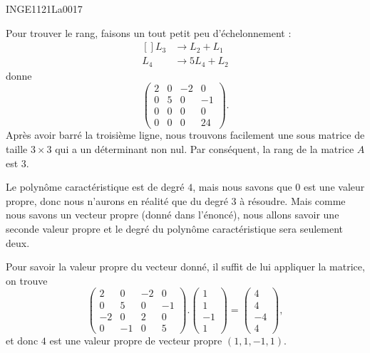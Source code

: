 

\begin{corrige}{INGE1121La0017}

	Pour trouver le rang, faisons un tout petit peu d'échelonnement :
	\begin{equation}
		\begin{aligned}[]
			L_3&\to L_2+L_1\\
			L_4&\to 5L_4+L_2
		\end{aligned}
	\end{equation}
	donne
	\begin{equation}
		\begin{pmatrix}
			 2	&	0	&	-2	&	0	\\
			 0	&	5	&	0	&	-1	\\
			 0	&	0	&	0	&	0	\\ 
			 0	&	0	&	0	&	24	 
		 \end{pmatrix}.
	\end{equation}
	Après avoir barré la troisième ligne, nous trouvons facilement une sous matrice de taille $3\times 3$ qui a un déterminant non nul. Par conséquent, la rang de la matrice $A$ est $3$.
	
	Le polynôme caractéristique est de degré $4$, mais nous savons que $0$ est une valeur propre, donc nous n'aurons en réalité que du degré $3$ à résoudre. Mais comme nous savons un vecteur propre (donné dans l'énoncé), nous allons savoir une seconde valeur propre et le degré du polynôme caractéristique sera seulement deux.

	Pour savoir la valeur propre du vecteur donné, il suffit de lui appliquer la matrice, on trouve
	\begin{equation}
		\begin{pmatrix}
			 2	&	0	&	-2	&	0	\\
			 0	&	5	&	0	&	-1	\\
			 -2	&	0	&	2	&	0	\\ 
			 0	&	-1	&	0	&	5	 
		 \end{pmatrix}.
		 \begin{pmatrix}
			 1	\\ 
			 1	\\ 
			 -1	\\ 
			 1	
		 \end{pmatrix}=
		 \begin{pmatrix}
			 4	\\ 
			 4	\\ 
			 -4	\\ 
			 4	
		 \end{pmatrix},
	\end{equation}
	et donc $4$ est une valeur propre de vecteur propre $(1,1,-1,1)$.


\end{corrige}
